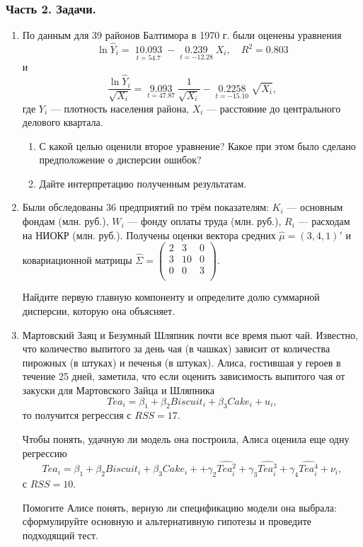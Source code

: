 \documentclass[12pt, a4paper]{article}
\begin{document}
\subsubsection*{Часть 2. Задачи.}


\begin{enumerate}

\item По данным для 39 районов Балтимора в 1970 г. были оценены уравнения
\[\ln {\hat Y_i} = \mathop {10.093}\limits_{t = 54.7}  - \mathop {0.239}\limits_{t =  - 12.28} {X_i},\quad {R^2} = 0.803\]
и
\[\frac{{\ln {{\hat Y}_i}}}{{\sqrt {{X_i}} }} = \mathop {9.093}\limits_{t = 47.87} \frac{1}{{\sqrt {{X_i}} }} - \mathop {0.2258}\limits_{t =  - 15.10} \sqrt {{X_i}} ,\]
где $Y_i$ — плотность населения района, $X_i$ — расстояние до центрального делового квартала.

\begin{enumerate}
\item С какой целью оценили второе уравнение? Какое при этом было сделано предположение о дисперсии ошибок?
\item Дайте интерпретацию полученным результатам.
\end{enumerate}

\item Были обследованы 36 предприятий по трём показателям:  $K_i$ — основным фондам (млн. руб.), $W_i$ — фонду оплаты труда (млн. руб.), $R_i$ — расходам на НИОКР (млн. руб.). Получены оценки вектора средних $\hat \mu = (3, 4, 1)'$ и ковариационной матрицы  $\hat\Sigma = \begin{pmatrix}
2 & 3 & 0 \\
3 & 10 & 0 \\
0 & 0 & 3 \\
\end{pmatrix}
$.

Найдите первую главную компоненту и определите долю суммарной дисперсии, которую она объясняет.

\item Мартовский Заяц и Безумный Шляпник почти все время пьют чай. Известно, что количество выпитого за день чая (в чашках) зависит от количества пирожных (в штуках) и печенья (в штуках). Алиса, гостившая у героев в течение 25 дней, заметила, что если оценить зависимость выпитого чая от закуски для Мартовского Зайца и Шляпника
\[
Tea_i = \beta_1 + \beta_2 Biscuit_i + \beta_3 Cake_i + u_i,
\]
то получится регрессия с $RSS = 17$.

Чтобы понять, удачную ли модель она построила, Алиса оценила еще одну регрессию
\[
Tea_i = \beta_1 + \beta_2 Biscuit_i + \beta_3 Cake_i +
   +\gamma_2 \widehat{Tea_i^2} +\gamma_3 \widehat{Tea_i^3} +\gamma_4 \widehat{Tea_i^4} + \nu_i,
\]
с $RSS = 10$.

Помогите Алисе понять, верную ли спецификацию модели она выбрала: сформулируйте основную и альтернативную гипотезы и проведите подходящий тест.



\end{enumerate}
\end{document}
